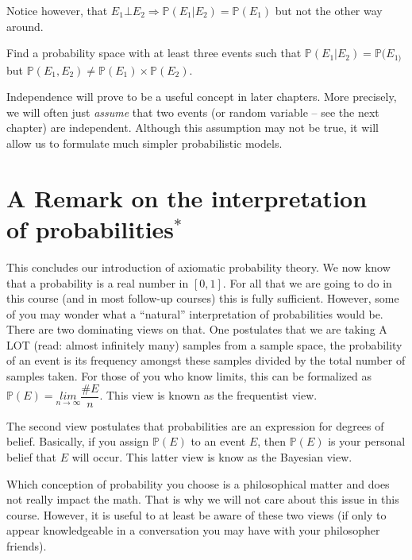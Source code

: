\documentclass[a4paper,11pt,leqno]{report}
\begin{document}
Notice however, that
$ E_{1} \bot E_{2} \Rightarrow \mathbb{P}(E_{1}|E_{2}) = \mathbb{P}(E_{1}) $ but not the other way around.

\begin{Exercise}
Find a probability space with at least three events such that $ \mathbb{P}(E_{1}|E_{2}) = \mathbb{P}(E_{1)} $
but $ \mathbb{P}(E_{1}, E_{2}) \not = \mathbb{P}(E_{1}) \times \mathbb{P}(E_{2}) $.
\end{Exercise}

Independence will prove to be a useful concept in later chapters. More precisely, we will often
just \textit{assume} that two events (or random variable -- see the next chapter) are independent. Although
this assumption may not be true, it will allow us to formulate much simpler probabilistic models.


\section{A Remark on the interpretation \\ of probabilities$^{*}$}

This concludes our introduction of axiomatic probability theory. We now know that a probability is
a real number in $ [0,1] $. For all that we are going to do in this course (and in most follow-up courses)
this is fully sufficient. However, some of you may wonder what a ``natural'' interpretation of probabilities
would be. There are two dominating views on that. One postulates that we are taking A LOT (read: almost
infinitely many) samples from a sample space, the probability of an event is its frequency amongst these
samples divided by the total number of samples taken. For those of you who know limits, this can be
formalized as $ \mathbb{P}(E) = \underset{n \rightarrow \infty}{lim} \dfrac{\#E}{n} $. This view
is known as the frequentist view.

The second view postulates that probabilities are an expression for degrees of belief. Basically, 
if you assign $ \mathbb{P}(E) $ to an event $ E $, then $ \mathbb{P}(E) $ is your personal belief that
$ E $ will occur. This latter view is know as the Bayesian view.

Which conception of probability you choose is a philosophical matter and does not really impact the math.
That is why we will not care about this issue in this course. However, it is useful to at least be aware
of these two views (if only to appear knowledgeable in a conversation you may have with your philosopher 
friends).
\end{document}
